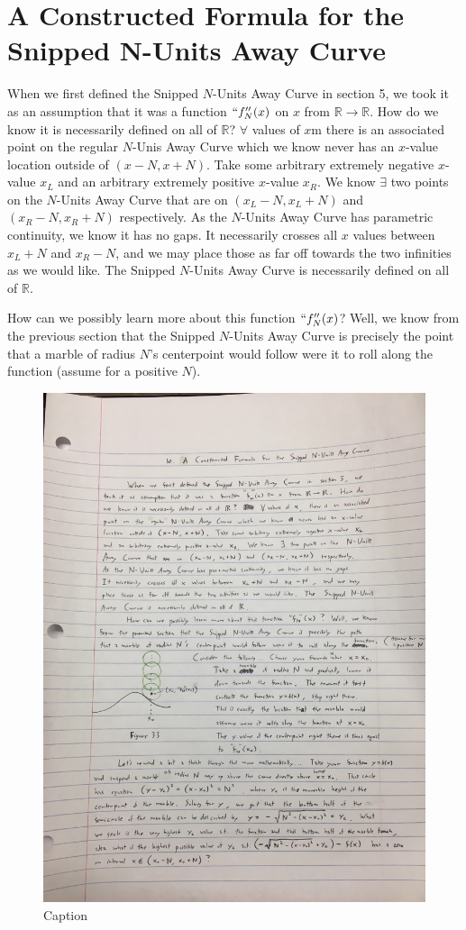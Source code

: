 \section{A Constructed Formula for the Snipped N-Units Away Curve}

When we first defined the Snipped $N$-Units Away Curve in section 5, we took it as an assumption that it was a function $``f_N''(x)$ on $x$ from $\mathbb{R} \xrightarrow{} \mathbb{R}$. How do we know it is necessarily defined on all of $\mathbb{R}$? $\forall$ values of $x$m there is an associated point on the regular $N$-Unis Away Curve which we know never has an $x$-value location outside of $(x-N, x+N)$. Take some arbitrary extremely negative $x$-value $x_L$ and an arbitrary extremely positive $x$-value $x_R$. We know $\exists$ two points on the $N$-Units Away Curve that are on $(x_L - N, x_L + N)$ and $(x_R - N, x_R + N)$ respectively. As the $N$-Units Away Curve has parametric continuity, we know it has no gaps. It necessarily crosses all $x$ values between $x_L + N$ and $x_R - N$, and we  may place those as far off towards the two infinities as we would like. The Snipped $N$-Units Away Curve is necessarily defined on all of $\mathbb{R}$.

How can we possibly learn more about this function $``f_N''(x)$? Well, we know from the previous section that the Snipped $N$-Units Away Curve is precisely the point that a marble of radius $N$'s centerpoint would follow were it to roll along the function (assume for a positive $N$).

\begin{figure}
  \includegraphics[width=.9\linewidth]{constructed-formula-img/Fig 10-33.png}
  \caption{Caption}
  \label{fig:fig10-33}
\end{figure}

